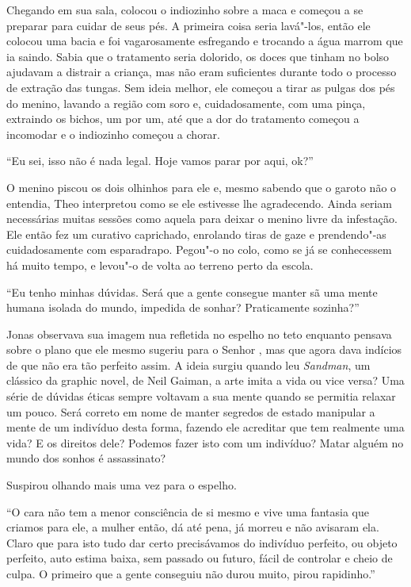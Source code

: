Chegando em sua sala, colocou o indiozinho sobre a maca e começou a se
preparar para cuidar de seus pés. A primeira coisa seria lavá"-los, então
ele colocou uma bacia e foi vagarosamente esfregando e trocando a água
marrom que ia saindo. Sabia que o tratamento seria dolorido, os doces
que tinham no bolso ajudavam a distrair a criança, mas não eram
suficientes durante todo o processo de extração das tungas. Sem ideia
melhor, ele começou a tirar as pulgas dos pés do menino, lavando a
região com soro e, cuidadosamente, com uma pinça, extraindo os bichos,
um por um, até que a dor do tratamento começou a incomodar e o
indiozinho começou a chorar.

``Eu sei, isso não é nada legal. Hoje vamos parar por aqui, ok?''

O menino piscou os dois olhinhos para ele e, mesmo sabendo que o garoto
não o entendia, Theo interpretou como se ele estivesse lhe agradecendo.
Ainda seriam necessárias muitas sessões como aquela para deixar o menino
livre da infestação. Ele então fez um curativo caprichado, enrolando
tiras de gaze e prendendo"-as cuidadosamente com esparadrapo. Pegou"-o no
colo, como se já se conhecessem há muito tempo, e levou"-o de volta ao
terreno perto da escola.

\asterisc


``Eu tenho minhas dúvidas. Será que a gente consegue manter sã uma mente
humana isolada do mundo, impedida de sonhar? Praticamente sozinha?''

Jonas observava sua imagem nua refletida no espelho no teto enquanto
pensava sobre o plano que ele mesmo sugeriu para o Senhor , mas que
agora dava indícios de que não era tão perfeito assim. A ideia surgiu
quando leu \emph{Sandman}, um clássico da graphic novel, de Neil Gaiman, a
arte imita a vida ou vice versa? Uma série de dúvidas éticas sempre
voltavam a sua mente quando se permitia relaxar um pouco. Será correto
em nome de manter segredos de estado manipular a mente de um indivíduo
desta forma, fazendo ele acreditar que tem realmente uma vida? E os
direitos dele? Podemos fazer isto com um indivíduo? Matar alguém no
mundo dos sonhos é assassinato?

Suspirou olhando mais uma vez para o espelho.

``O cara não tem a menor consciência de si mesmo e vive uma fantasia que
criamos para ele, a mulher então, dá até pena, já morreu e não avisaram
ela. Claro que para isto tudo dar certo precisávamos do indivíduo
perfeito, ou objeto perfeito, auto estima baixa, sem passado ou futuro,
fácil de controlar e cheio de culpa. O primeiro que a gente conseguiu
não durou muito, pirou rapidinho.''

